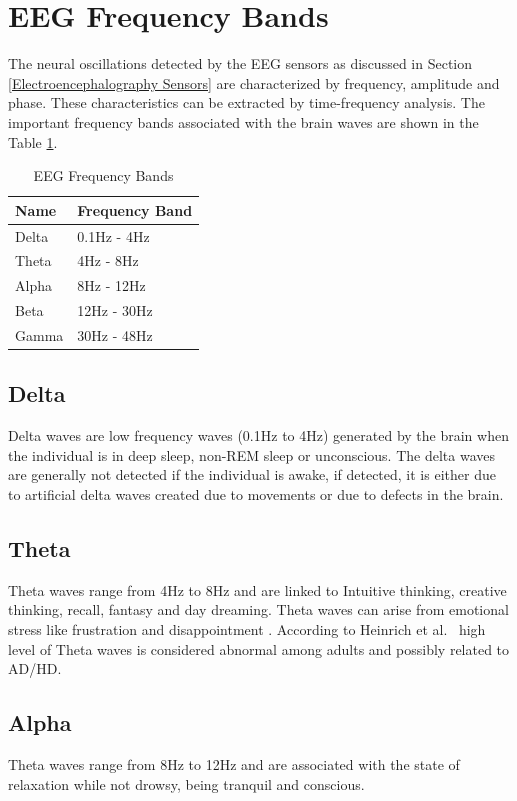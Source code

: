         
    \section{EEG Frequency Bands}
    \label{EEG Frequency Bands}
    
    The neural oscillations detected by the EEG sensors as discussed in Section \ref{Electroencephalography Sensors} are characterized by frequency, amplitude and phase. These characteristics can be extracted by time-frequency analysis. The important frequency bands associated with the brain waves are shown in the Table \ref{Table:Bands}.
    
	\begin{table}[h!]
		\centering
		\caption{EEG Frequency Bands}
		\label{Table:Bands}
		\begin{tabular}{l l}
			\hline
			Name &Frequency Band\\\hline
			Delta&0.1Hz - 4Hz\\
			Theta&4Hz - 8Hz\\
			Alpha&8Hz - 12Hz\\
			Beta&12Hz - 30Hz\\
			Gamma&30Hz - 48Hz\\
		\end{tabular}
	\end{table}

	\subsection{Delta}
    	Delta waves are low frequency waves (0.1Hz to 4Hz) generated by the brain when the individual is in deep sleep, non-REM sleep or unconscious. The delta waves are generally not detected if the individual is awake, if detected, it is either due to artificial delta waves created due to movements or due to defects in the brain.
        
	\subsection{Theta}
    	Theta waves range from 4Hz to 8Hz and are linked to Intuitive thinking, creative thinking, recall, fantasy and day dreaming. Theta waves can arise from emotional stress like frustration and disappointment \cite{YanZhang}. According to Heinrich et al.~\cite{H.H.Jasper} high level of Theta waves is considered abnormal among adults and possibly related to AD/HD.
        
	\subsection{Alpha}
    	Theta waves range from 8Hz to 12Hz and are associated with the state of relaxation while not drowsy, being tranquil and conscious.
    

